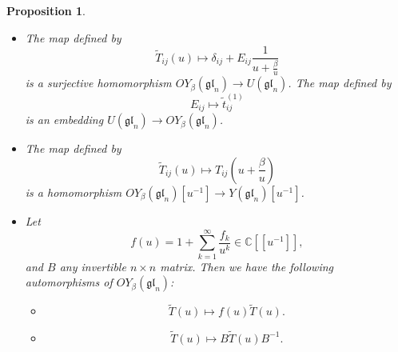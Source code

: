\documentclass[10pt]{article}%
\numberwithin{equation}{section}
\newtheorem{prop}[thm]{Proposition}
\newcommand{\red}{\color{red}}
\newcommand{\gl}{{\mathfrak{gl}}}
\begin{document}
\begin{prop}\label{prop:SurjectiveHomomorphism}
\begin{itemize}
    \item[(i)] 
    The map defined by
    \begin{equation}\label{eqn:DefSurHom_1}
    \tilde{T}_{ij} (u)\mapsto \delta_{ij}+ E_{ij}\frac{1}{u+\frac{\beta}{u}}   
    \end{equation}
    is a surjective homomorphism $OY_{\beta}(\gl_n)\to U(\gl_n)$. The map defined by
    \begin{equation}\label{eqn:DefSurHom_2}
    E_{ij}\mapsto \tilde{t}_{ij}^{(1)}
    \end{equation}
    is an embedding $U(\gl_n)\to OY_{\beta}(\gl_n)$.
\item[(ii)]   The map defined by
\begin{equation}\label{eqn:Homomorf_1}
    \tilde{T}_{ij} (u)\mapsto T_{ij}(u+\frac{\beta}{u})      \end{equation}
    is a  homomorphism $OY_{\beta}(\gl_n)[u^{-1}]\to Y(\gl_n)[u^{-1}]$.
    \item[(iii)] Let
 \[
 f(u)=1+\sum\limits_{k=1}^{\infty}\frac{f_k}{u^k}\in \mathbb{C}[[u^{-1}]],
 \]
 and $B$ any invertible $n\times n$ matrix. Then we have the following automorphisms of $OY_{\beta}(\gl_n)$:
 \begin{itemize}
 \item[(a)]
 \begin{equation}
\tilde{T}(u)\mapsto f(u)\tilde{T}(u).
\end{equation}

\item[(b)]
\begin{equation}
    \tilde{T}(u)\mapsto B \tilde{T}(u) B^{-1}.
\end{equation}
\end{itemize}
    \end{itemize}
\end{prop}
\end{document}
